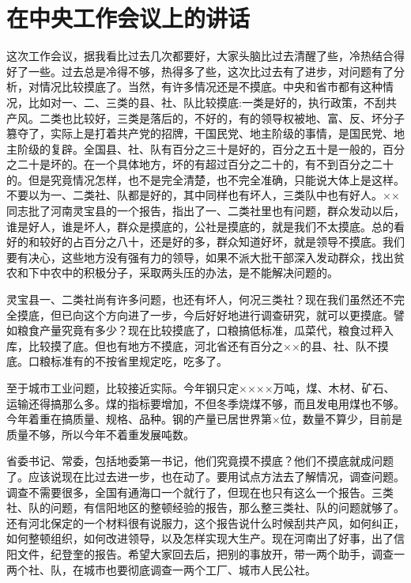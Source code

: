 \section[在中央工作会议上的讲话（一九六一年一月十三日）]{在中央工作会议上的讲话}

这次工作会议，据我看比过去几次都要好，大家头脑比过去清醒了些，冷热结合得好了一些。过去总是冷得不够，热得多了些，这次比过去有了进步，对问题有了分析，对情况比较摸底了。当然，有许多情况还是不摸底。中央和省市都有这种情况，比如对一、二、三类的县、社、队比较摸底:一类是好的，执行政策，不刮共产风。二类也比较好，三类是落后的，不好的，有的领导权被地、富、反、坏分子篡夺了，实际上是打着共产党的招牌，干国民党、地主阶级的事情，是国民党、地主阶级的复辟。全国县、社、队有百分之三十是好的，百分之五十是一般的，百分之二十是坏的。在一个具体地方，坏的有超过百分之二十的，有不到百分之二十的。但是究竟情况怎样，也不是完全清楚，也不完全准确，只能说大体上是这样。不要以为一、二类社、队都是好的，其中同样也有坏人，三类队中也有好人。××同志批了河南灵宝县的一个报告，指出了一、二类社里也有问题，群众发动以后，谁是好人，谁是坏人，群众是摸底的，公社是摸底的，就是我们不太摸底。总的看好的和较好的占百分之八十，还是好的多，群众知道好坏，就是领导不摸底。我们要有决心，这些地方没有强有力的领导，如果不派大批干部深入发动群众，找出贫农和下中农中的积极分子，采取两头压的办法，是不能解决问题的。

灵宝县一、二类社尚有许多问题，也还有坏人，何况三类社？现在我们虽然还不完全摸底，但已向这个方向进了一步，今后好好地进行调查研究，就可以更摸底。譬如粮食产量究竟有多少？现在比较摸底了，口粮搞低标准，瓜菜代，粮食过秤入库，比较摸了底。但也有地方不摸底，河北省还有百分之××的县、社、队不摸底。口粮标准有的不按省里规定吃，吃多了。

至于城市工业问题，比较接近实际。今年钢只定××××万吨，煤、木材、矿石、运输还得搞那么多。煤的指标要增加，不但冬季烧煤不够，而且发电用煤也不够。今年着重在搞质量、规格、品种。钢的产量已居世界第×位，数量不算少，目前是质量不够，所以今年不着重发展吨数。

省委书记、常委，包括地委第一书记，他们究竟摸不摸底？他们不摸底就成问题了。应该说现在比过去进一步，也在动了。要用试点方法去了解情况，调查问题。调查不需要很多，全国有通海口一个就行了，但现在也只有这么一个报告。三类社、队的问题，有信阳地区的整顿经验的报告，那么整三类社、队的问题就够了。还有河北保定的一个材料很有说服力，这个报告说什么时候刮共产风，如何纠正，如何整顿组织，如何改进领导，以及怎样实现大生产。现在河南出了好事，出了信阳文件，纪登奎的报告。希望大家回去后，把别的事放开，带一两个助手，调查一两个社、队，在城市也要彻底调查一两个工厂、城市人民公社。

